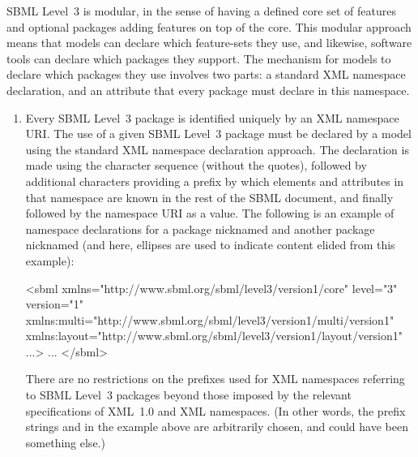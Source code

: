 SBML Level~3 is modular, in the sense of having a defined core set
of features and optional packages adding features on top of the
core.  This modular approach means that models can declare which
feature-sets they use, and likewise, software tools can declare
which packages they support.  The mechanism for models to declare
which packages they use involves two parts: a standard XML
namespace declaration, and an attribute that every package must
declare in this namespace.
\begin{enumerate}

\item Every SBML Level~3 package is identified uniquely by an XML
  namespace URI.  The use of a given SBML Level~3 package must be
  declared by a model using the standard XML namespace declaration
  approach.  The declaration is made using the character sequence
   (without the quotes), followed by additional
  characters providing a prefix by which elements and attributes
  in that namespace are known in the rest of the SBML document,
  and finally followed by the namespace URI as a value.  The
  following is an example of namespace declarations for a package
  nicknamed  and another package nicknamed 
  (and here, ellipses are used to indicate content elided from
  this example):
  \begin{example}
<sbml xmlns="http://www.sbml.org/sbml/level3/version1/core" level="3" version="1"
      xmlns:multi="http://www.sbml.org/sbml/level3/version1/multi/version1"
      xmlns:layout="http://www.sbml.org/sbml/level3/version1/layout/version1" ...>
  ...  
  </sbml>\end{example}
  There are no restrictions on the prefixes used for XML namespaces
  referring to SBML Level~3 packages beyond those imposed by the
  relevant specifications of XML~1.0 and XML namespaces.  (In other
  words, the prefix strings  and  in the
  example above are arbitrarily chosen, and could have been
  something else.)


\end{enumerate}
